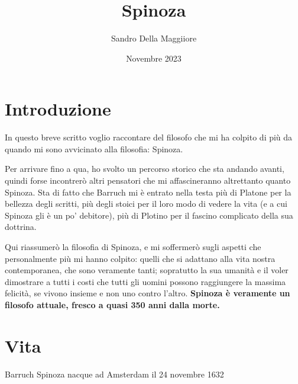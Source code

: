 \documentclass[a4paper,12pt,notitlepage]{report}
\begin{document}
	\author{Sandro Della Maggiiore}
	\title{Spinoza}
	\date{Novembre 2023}
	\maketitle
	\chapter*{Introduzione}
	
	In questo breve scritto voglio  raccontare del filosofo che mi ha colpito di più da quando mi sono avvicinato alla filosofia: Spinoza.
	
	Per arrivare fino a qua, ho svolto un percorso storico che sta andando avanti, quindi forse incontrerò  altri pensatori che mi affascineranno altrettanto quanto Spinoza. Sta di fatto che Barruch mi è entrato nella testa più di Platone per la bellezza degli scritti, più degli stoici per il loro modo di vedere la vita (e a cui Spinoza gli è un po' debitore), più di Plotino per il fascino complicato della sua dottrina.
	
	Qui riassumerò la filosofia di Spinoza, e mi soffermerò sugli aspetti che  personalmente più mi hanno colpito: quelli che si adattano alla vita nostra contemporanea, che sono veramente tanti; sopratutto la sua umanità e il voler dimostrare a tutti i costi che tutti gli uomini possono raggiungere la massima felicità, se vivono insieme e non uno contro l'altro. \textbf{Spinoza è veramente un filosofo attuale, fresco a quasi 350 anni dalla morte.}
	\chapter*{Vita}
	
	
	Barruch Spinoza nacque ad Amsterdam il 24 novembre 1632
	
	
	
\end{document}
